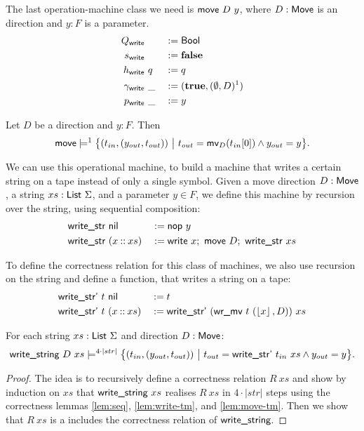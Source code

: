 \documentclass{psartcl}
\begin{document}
The last operation-machine class we need is $\textsf{move}~D~y$, where $D : \textsf{Move}$ is an direction and $y : F$ is a parameter.
\begin{alignat*}{3}
  Q_     {\textsf{write}} &~  &&:= \textsf{Bool} \\
  s_     {\textsf{write}} &~  &&:= \mathbf{false} \\
  h_     {\textsf{write}} &~q &&:= q \\
  \gamma_{\textsf{write}} &~\_&&:= (\mathbf{true}, (\emptyset, D)^1) \\
  p_     {\textsf{write}} &~\_&&:= y
\end{alignat*}
\begin{lemma}
  \label{lem:move-tm}
  Let $D$ be a direction and $y : F$.  Then
  $$\textsf{move} \models^1 \bigl\{ (t_{in}, (y_{out}, t_{out}))~\big|~t_{out} = \textsf{mv}_D (t_{in}[0]) \land y_{out} = y \bigr \}.$$
\end{lemma}

We can use this operational machine, to build a machine that writes a certain string on a tape instead of only a single symbol.
Given a move direction $D : \textsf{Move}$, a string $xs : \textsf{List}~\Sigma$, and a parameter $y \in F$, we define this machine by recursion over the string,
using sequential composition:
\begin{alignat*}{3}
  \textsf{write\_str}&~\textsf{nil}         &&:= \textsf{nop}~y \\
  \textsf{write\_str}&~(x \mathbin{::} xs) &&:= \textsf{write}~x ;~ \textsf{move}~D ;~ \textsf{write\_str}~xs
\end{alignat*}

To define the correctness relation for this class of machines, we also use recursion on the string and define a function, that writes a string on a
tape:
\begin{alignat*}{3}
  \textsf{write\_str'}~t &~\textsf{nil}         &&:= t \\
  \textsf{write\_str'}~t &~(x \mathbin{::} xs) &&:= \textsf{write\_str'}~(\textsf{wr\_mv}~t~(\left\lfloor {x}\right\rfloor, D))~xs
\end{alignat*}

\begin{lemma}
  \label{lem:write-string}
  For each string $xs : \textsf{List}~\Sigma$ and direction $D : \textsf{Move}$:
  $$\textsf{write\_string}~D~xs \models^{4 \cdot \left|str\right|} \bigl\{ (t_{in}, (y_{out}, t_{out}))~\big|~t_{out} = \textsf{write\_str'}~t_{in}~xs \land
    y_{out} = y \bigr \}.$$
\end{lemma}
\begin{proof}
  The idea is to recursively define a correctness relation $R~xs$ and show by induction on $xs$ that $\textsf{write\_string}~xs$ realises $R~xs$ in
  $4 \cdot \left|str\right|$ steps using the correctness lemmas \ref{lem:seq}, \ref{lem:write-tm}, and \ref{lem:move-tm}.
  Then we show that $R~xs$ is a includes the correctness relation of $\textsf{write\_string}$.
\end{proof}
\end{document}
